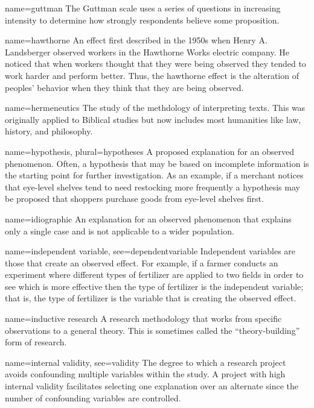 {name={guttman}}
{%
	The Guttman scale uses a series of questions in increasing intensity to determine how strongly respondents believe some proposition. 
}

{name={hawthorne}}
{%
	An effect first described in the 1950s when Henry A. Landsberger observed workers in the Hawthorne Works electric company. He noticed that when workers thought that they were being observed they tended to work harder and perform better. Thus, the hawthorne effect is the alteration of peoples' behavior when they think that they are being observed.
}

{name={hermeneutics}}
{%
	The study of the methdology of interpreting texts. This was originally applied to Biblical studies but now includes most humanities like law, history, and philosophy.
}

{name={hypothesis},
	plural={hypotheses}}
{%
	A proposed explanation for an observed phenomenon. Often, a hypothesis that may be based on incomplete information is the starting point for further investigation. As an example, if a merchant notices that eye-level shelves tend to need restocking more frequently a hypothesis may be proposed that shoppers purchase goods from eye-level shelves first. 
}

{name={idiographic}}
{%
	An explanation for an observed phenomenon that explains only a single case and is not applicable to a wider population.
}

{name={independent variable},
	see={dependentvariable}}
{%
	Independent variables are those that create an observed effect. For example, if a farmer conducts an experiment where different types of fertilizer are applied to two fields in order to see which is more effective then the type of fertilizer is the independent variable; that is, the type of fertilizer is the variable that is creating the observed effect.
}

{name={inductive research}}
{%
	A research methodology that works from specific observations to a general theory. This is sometimes called the ``theory-building'' form of research.
}

{name={internal validity},
	see={validity}}
{%
	The degree to which a research project avoids confounding multiple variables within the study. A project with high internal validity facilitates selecting one explanation over an alternate since the number of confounding variables are controlled.
}


